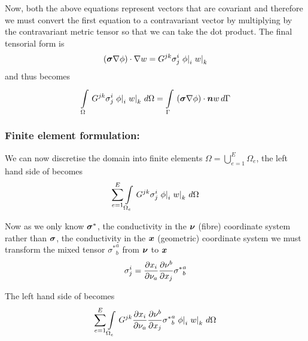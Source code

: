 Now, both the above equations represent vectors that are covariant and therefore we must convert the
first equation to a contravariant vector by multiplying by the contravariant
metric tensor so that we can take the dot product. The final tensorial form is
\begin{equation}
  \left( \boldsymbol{\sigma}\nabla\phi \right)\cdot\nabla w = G^{jk}\sigma^{i}_{j} \left. \phi \right|_{i}  \left. w \right|_{k} 
\end{equation}
and thus  becomes
\begin{equation}
  \gint{\Omega}{}{G^{jk}\sigma^{i}_{j}\covarderiv{\phi}{i}\covarderiv{w}{k}}{\Omega}=
  \gint{\Gamma}{}{\dotprod{\pbrac{\tensor{\sigma}\grad\phi}}{\vect{n}w}}{\Gamma}
  \label{eqn:Laplaceweightedresidualtensorform}
\end{equation}

\subsubsection{Finite element formulation:}
We can now discretise the domain into finite elements \ie $\Omega=
\displaystyle{\bigcup_{e=1}^{E}}\Omega_{e}$, the left hand side of
 becomes
\begin{equation}
  \displaystyle\sum_{e=1}^{E}  \displaystyle\int\limits_{\Omega_{e}}^{} \,G^{jk}\sigma^{i}_{j} \left. \phi \right|_{i}  \left. w \right|_{k} \,d\Omega 
\end{equation}

Now as we only know $\boldsymbol{\sigma}^{*}$, the conductivity in the
$\vect{\nu}$ (fibre) coordinate system rather than $\boldsymbol{\sigma}$, the
conductivity in the $\vect{x}$ (geometric) coordinate system we must transform the mixed
tensor ${\sigma^{*}}^{a}_{b}$ from $\vect{\nu}$ to $\vect{x}$
\begin{equation}
  \sigma^{i}_{j}= \dfrac{\partial x_{i}}{\partial \nu_{a}}  \dfrac{\partial \nu^{b}}{\partial x_{j}} {\sigma^{*}}^{a}_{b}
\end{equation}

The left hand side of  becomes
\begin{equation}
  \displaystyle\sum_{e=1}^{E}  \displaystyle\int\limits_{\Omega_{e}}^{} \,G^{jk} \dfrac{\partial x_{i}}{\partial \nu_{a}}  \dfrac{\partial \nu^{b}}{\partial x_{j}} {\sigma^{*}}^{a}_{b} \left. \phi \right|_{i}  \left. w \right|_{k} \,d\Omega 
\end{equation}

